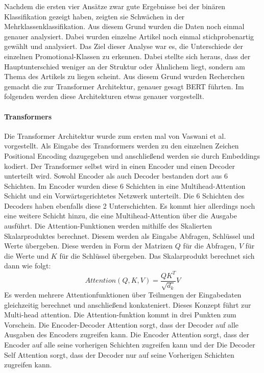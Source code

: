 Nachdem die ersten vier Ansätze zwar gute Ergebnisse bei der binären Klassifikation gezeigt haben, zeigten sie Schwächen in der Mehrklassenklassifikation. Aus diesem Grund wurden die Daten noch einmal genauer analysiert. Dabei wurden einzelne Artikel noch einmal stichprobenartig gewählt und analysiert. Das Ziel dieser Analyse war es, die Unterschiede der einzelnen Promotional-Klassen zu erkennen. Dabei stellte sich heraus, dass der Hauptunterschied weniger an der Struktur oder Ähnlichem liegt, sondern am Thema des Artikels zu liegen scheint. Aus diesem Grund wurden Recherchen gemacht die zur Transformer Architektur, genauer gesagt BERT führten. Im folgenden werden diese Architekturen etwas genauer vorgestellt.
\paragraph{Transformers}
Die Transformer Architektur wurde zum ersten mal von Vaswani et al. \cite{Attention} vorgestellt. Als Eingabe des Transformers werden zu den einzelnen Zeichen Positional Encoding dazugegeben und anschließend werden sie durch Embeddings kodiert. Der Transformer selbst wird in einen Encoder und einen Decoder unterteilt wird. Sowohl Encoder als auch Decoder bestanden dort aus 6 Schichten. Im Encoder wurden diese 6 Schichten in eine Multihead-Attention Schicht und ein Vorwärtsgerichtetes Netzwerk unterteilt. Die 6 Schichten des Decoders haben ebenfalls diese 2 Unterschichten. Es kommt hier allerdings noch eine weitere Schicht hinzu, die eine Multihead-Attention über die Ausgabe ausführt. Die Attention-Funktionen werden mithilfe des Skalierten Skalarproduktes berechnet. Diesem werden als Eingabe Abfragen, Schlüssel und Werte übergeben. Diese werden in Form der Matrizen $Q$ für die Abfragen, $V$ für die Werte und $K$ für die Schlüssel übergeben. Das Skalarprodukt berechnet sich dann wie folgt:
$${Attention(Q,K,V)} = {\frac{QK^T}{\sqrt{d_k}} V}$$
Es werden mehrere Attentionfunktionen über Teilmengen der Eingabedaten gleichzeitig berechnet und anschließend konkateniert. Dieses Konzept führt zur Multi-head attention. Die Attention-funktion kommt in drei Punkten zum Vorschein. Die Encoder-Decoder Attention sorgt, dass der Decoder auf alle Ausgaben des Encoders zugreifen kann. Die Encoder Attention sorgt, dass der Encoder auf alle seine vorherigen Schichten zugreifen kann und der Die Decoder Self Attention sorgt, dass der Decoder nur auf seine Vorherigen Schichten zugreifen kann.
